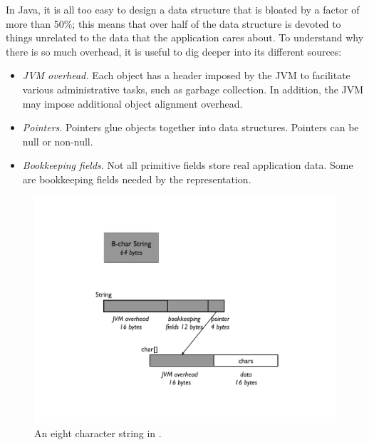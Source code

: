 In Java, it is all too easy to design a data structure that is bloated by a factor of more than 50\%; this means that over half of the data structure is devoted to things unrelated to the data that the application cares about. To understand why there is so much overhead, it is useful to dig deeper into its different sources:  
\begin{itemize}
\item \emph{JVM overhead.}   Each
object has a header imposed by the JVM to facilitate various administrative tasks, such as garbage collection. In addition, the JVM may impose additional object alignment overhead.
\item \emph{Pointers}. Pointers glue objects together into data structures. Pointers can be null or non-null.   
\item \emph{Bookkeeping fields}.  Not all primitive
fields store real application data. Some are bookkeeping fields needed by the representation.
\end{itemize}


\begin{figure}
  \centering
  \includegraphics[width=.70\textwidth]{part1/Figures/memoryhealth/eight-char-string.pdf}
  \caption{An eight character string in \javasix.}
  \label{fig:eight-char-string}
\end{figure}

